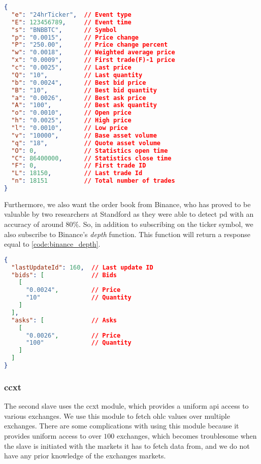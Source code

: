 \begin{lstlisting}[language=json, caption={Ticker response from Binance (Source \cite{binance_git})}, label=code:binance_tick]
{
  "e": "24hrTicker",  // Event type
  "E": 123456789,     // Event time
  "s": "BNBBTC",      // Symbol
  "p": "0.0015",      // Price change
  "P": "250.00",      // Price change percent
  "w": "0.0018",      // Weighted average price
  "x": "0.0009",      // First trade(F)-1 price
  "c": "0.0025",      // Last price
  "Q": "10",          // Last quantity
  "b": "0.0024",      // Best bid price
  "B": "10",          // Best bid quantity
  "a": "0.0026",      // Best ask price
  "A": "100",         // Best ask quantity
  "o": "0.0010",      // Open price
  "h": "0.0025",      // High price
  "l": "0.0010",      // Low price
  "v": "10000",       // Base asset volume
  "q": "18",          // Quote asset volume
  "O": 0,             // Statistics open time
  "C": 86400000,      // Statistics close time
  "F": 0,             // First trade ID
  "L": 18150,         // Last trade Id
  "n": 18151          // Total number of trades
}
\end{lstlisting}

Furthermore, we also want the order book from Binance, who has proved to be valuable by two researchers at Standford as they were able to detect \ac{pd} with an accuracy of around $80\%$. So, in addition to subscribing on the ticker symbol, we also subscribe to Binance's \emph{depth} function. This function will return a response equal to \autoref{code:binance_depth}.

\begin{lstlisting}[language=json, caption={Depth response from Binance (Source \cite{binance_git})}, label=code:binance_depth]
{
  "lastUpdateId": 160,  // Last update ID
  "bids": [             // Bids
    [
      "0.0024",         // Price
      "10"              // Quantity
    ]
  ],
  "asks": [             // Asks
    [
      "0.0026",         // Price
      "100"             // Quantity
    ]
  ]
}
\end{lstlisting}

\subsubsection{ccxt}
The second slave uses the ccxt module, which provides a uniform \ac{api} access to various exchanges. We use this module to fetch \ac{ohlc} values over multiple exchanges. There are some complications with using this module because it provides uniform access to over $100$ exchanges, which becomes troublesome when the slave is initiated with the markets it has to fetch data from, and we do not have any prior knowledge of the exchanges markets.

